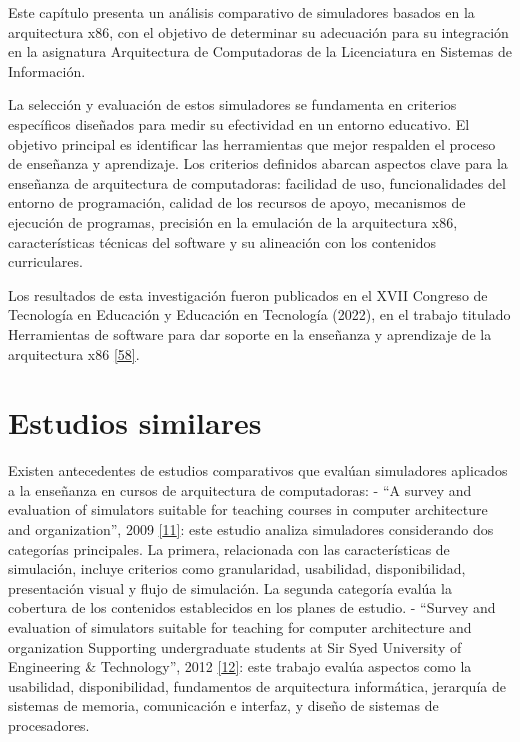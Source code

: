 \documentclass[12pt,oneside]{templates/unerthesis}
\begin{document}
Este capítulo presenta un análisis comparativo de simuladores basados en la arquitectura x86, con el objetivo de determinar su adecuación para su integración en la asignatura Arquitectura de Computadoras de la Licenciatura en Sistemas de Información.

La selección y evaluación de estos simuladores se fundamenta en criterios específicos diseñados para medir su efectividad en un entorno educativo. El objetivo principal es identificar las herramientas que mejor respalden el proceso de enseñanza y aprendizaje. Los criterios definidos abarcan aspectos clave para la enseñanza de arquitectura de computadoras: facilidad de uso, funcionalidades del entorno de programación, calidad de los recursos de apoyo, mecanismos de ejecución de programas, precisión en la emulación de la arquitectura x86, características técnicas del software y su alineación con los contenidos curriculares.

Los resultados de esta investigación fueron publicados en el XVII Congreso de Tecnología en Educación y Educación en Tecnología (2022), en el trabajo titulado Herramientas de software para dar soporte en la enseñanza y aprendizaje de la arquitectura x86 \protect\hyperlink{ref-colombani_herramientas_2022}{{[}58{]}}.

\hypertarget{estudios-similares}{%
\section{Estudios similares}\label{estudios-similares}}

Existen antecedentes de estudios comparativos que evalúan simuladores aplicados a la enseñanza en cursos de arquitectura de computadoras:
- ``A survey and evaluation of simulators suitable for teaching courses in computer architecture and organization'', 2009 \protect\hyperlink{ref-nikolic_survey_2009}{{[}11{]}}: este estudio analiza simuladores considerando dos categorías principales. La primera, relacionada con las características de simulación, incluye criterios como granularidad, usabilidad, disponibilidad, presentación visual y flujo de simulación. La segunda categoría evalúa la cobertura de los contenidos establecidos en los planes de estudio.
- ``Survey and evaluation of simulators suitable for teaching for computer architecture and organization Supporting undergraduate students at Sir Syed University of Engineering \& Technology'', 2012 \protect\hyperlink{ref-hasan_survey_2012}{{[}12{]}}: este trabajo evalúa aspectos como la usabilidad, disponibilidad, fundamentos de arquitectura informática, jerarquía de sistemas de memoria, comunicación e interfaz, y diseño de sistemas de procesadores.
\end{document}
